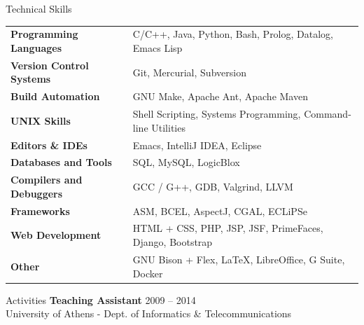 \documentclass{resume}
\begin{document}

\begin{rSection}{Technical Skills}

{\renewcommand{\arraystretch}{1.3}
\begin{tabular}{ @{} >{\bfseries}l @{\hspace{6ex}} l }

Programming Languages
   & C/C++, Java, Python, Bash, Prolog, Datalog, Emacs Lisp \\

Version Control Systems
   & Git, Mercurial, Subversion \\

Build Automation
   & GNU Make, Apache Ant, Apache Maven \\

UNIX Skills
   & Shell Scripting, Systems Programming, Command-line Utilities \\

Editors \& IDEs
   & Emacs, IntelliJ IDEA, Eclipse \\

Databases and Tools
   & SQL, MySQL, LogicBlox \\

Compilers and Debuggers
   & GCC / G++, GDB, Valgrind, LLVM \\


Frameworks
   & ASM, BCEL, AspectJ, CGAL, ECLiPSe \\

Web Development
   & HTML + CSS, PHP, JSP, JSF, PrimeFaces, Django, Bootstrap \\

Other
   & GNU Bison + Flex, \LaTeX{}, LibreOffice, G Suite, Docker \\
\end{tabular}}
\end{rSection}


\begin{rSection}{Activities}
  {\bf Teaching Assistant} \hfill {2009 -- 2014} \\
  University of Athens - Dept. of Informatics \& Telecommunications \\
\end{rSection}
\end{document}
